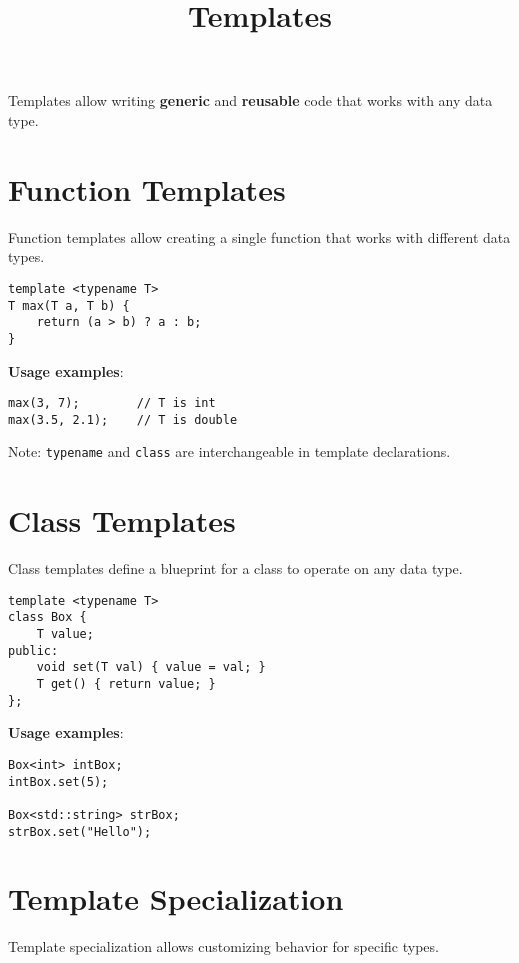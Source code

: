 \documentclass{article}
\title{Templates}
\author{}
\date{}
\begin{document}
\maketitle


Templates allow writing \textbf{generic} and \textbf{reusable} code that works with any data type.

\section{Function Templates}

Function templates allow creating a single function that works with different data types.

\begin{lstlisting}[style=cppstyle]
template <typename T>
T max(T a, T b) {
    return (a > b) ? a : b;
}
\end{lstlisting}

\textbf{Usage examples}:
\begin{lstlisting}[style=cppstyle]
max(3, 7);        // T is int
max(3.5, 2.1);    // T is double
\end{lstlisting}

Note: \texttt{typename} and \texttt{class} are interchangeable in template declarations.

\section{Class Templates}

Class templates define a blueprint for a class to operate on any data type.

\begin{lstlisting}[style=cppstyle]
template <typename T>
class Box {
    T value;
public:
    void set(T val) { value = val; }
    T get() { return value; }
};
\end{lstlisting}

\textbf{Usage examples}:
\begin{lstlisting}[style=cppstyle]
Box<int> intBox;
intBox.set(5);

Box<std::string> strBox;
strBox.set("Hello");
\end{lstlisting}

\section{Template Specialization}

Template specialization allows customizing behavior for specific types.
\end{document}
